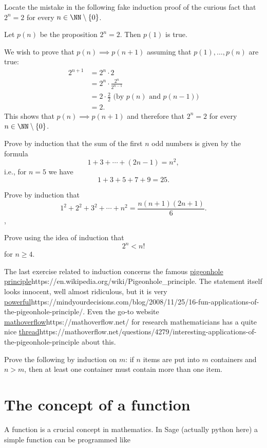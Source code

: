 \documentclass{article}
\begin{document}
\beginshex
Locate the mistake in the following fake induction proof of the curious fact that
$2^n = 2$ 
for every $n\in \NN\setminus\{0\}$.

Let $p(n)$ be
the proposition $2^n = 2$. Then $p(1)$ is true.

We wish to prove that $p(n) \implies p(n+1)$ assuming that $p(1), \dots, p(n)$ are true:
\begin{align*}
  2^{n+1} &= 2^n \cdot 2\\
          &= 2^n \cdot \frac{2^n}{2^{n-1}}\\
          &= 2 \cdot \frac{2}{2}\,\,\text{(by }p(n)\text{ and }p(n-1)\text{)}\\
          &= 2.
\end{align*}
This shows that $p(n) \implies p(n+1)$ and therefore that $2^n = 2$ for every
$n\in \NN\setminus\{0\}$.
\endshex

\beginshex
Prove by induction that the sum of the first $n$ odd numbers is
given by the formula
$$
1 + 3 + \cdots + (2 n - 1) = n^2,
$$
i.e., for $n=5$ we have
$$
1 + 3 + 5 + 7 + 9 = 25.
$$
\endshex

\beginshex
Prove by induction that
$$
1^2 + 2^2 + 3^2 + \cdots + n^2 = \frac{n(n+1)(2n + 1)}{6}.
$$, 
\endshex

\beginshex
Prove using the idea of induction that
$$
2^n < n!
$$
for $n\geq 4$.

\endshex

The last exercise related to induction concerns the famous \url{pigeonhole principle}{https://en.wikipedia.org/wiki/Pigeonhole_principle}. The statement itself looks innocent, well almost ridiculous, but it is very \url{powerful}{https://mindyourdecisions.com/blog/2008/11/25/16-fun-applications-of-the-pigeonhole-principle/}. Even the go-to website 
\url{mathoverflow}{https://mathoverflow.net/} for research mathematicians has 
a quite nice \url{thread}{https://mathoverflow.net/questions/4279/interesting-applications-of-the-pigeonhole-principle} 
about this.

\beginshex
Prove the following by induction on $m$: if $n$ items are put into $m$ containers and 
$n > m$, then at least one container must contain more than one item.
\endshex

\section{The concept of a function}

A function is a crucial concept in mathematics. In Sage (actually python here) a simple function can be
programmed like
\end{document}
